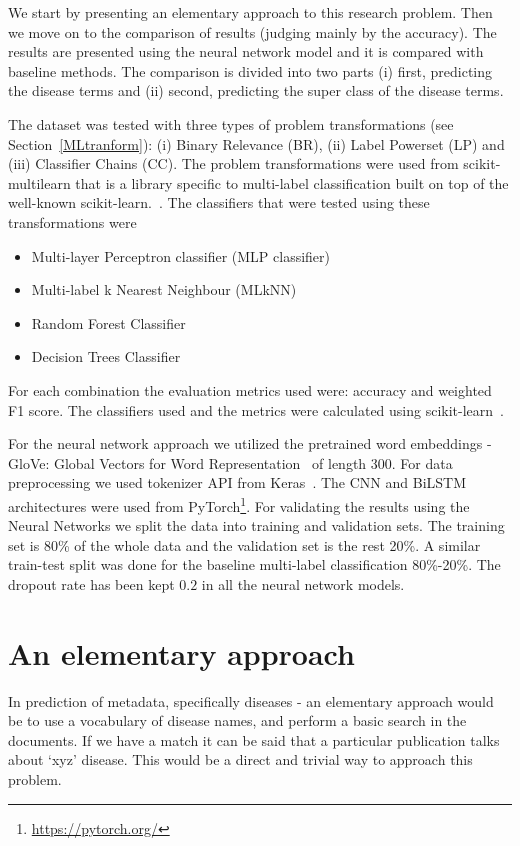 We start by presenting an elementary approach to this research problem. Then we move on to the comparison of results (judging mainly by the accuracy). The results are presented using the neural network model and it is compared with baseline methods. The comparison is divided into two parts (i) first, predicting the disease terms and (ii) second, predicting the super class of the disease terms.

The dataset was tested with three types of problem transformations (see Section~\ref{MLtranform}): (i) Binary Relevance (BR), (ii) Label Powerset (LP) and (iii) Classifier Chains (CC). The problem transformations were used from scikit-multilearn that is a library specific to multi-label classification built on top of the well-known scikit-learn.~\cite{2017arXiv171100046S}. The classifiers that were tested using these transformations were 
\begin{itemize}
    \item Multi-layer Perceptron classifier (MLP classifier) 
    \item Multi-label k Nearest Neighbour (MLkNN) 
    \item Random Forest Classifier 
    \item Decision Trees Classifier 
\end{itemize}
For each combination the evaluation metrics used were: accuracy and weighted F1 score. The classifiers used and the metrics were calculated using scikit-learn~\cite{scikit-learn}. 

For the neural network approach we utilized the pretrained word embeddings - GloVe: Global Vectors for Word Representation~\cite{pennington2014glove} of length 300. For data preprocessing we used tokenizer API from Keras~\cite{chollet2015keras}. The CNN and BiLSTM architectures were used from PyTorch\footnote{\url{https://pytorch.org/}}.
For validating the results using the Neural Networks we split the data into training and validation sets. The training set is 80\% of the whole data and the validation set is the rest 20\%. A similar train-test split was done for the baseline multi-label classification 80\%-20\%. The dropout rate has been kept $0.2$ in all the neural network models. 

\section{An elementary approach}
In prediction of metadata, specifically diseases - an elementary approach would be to use a vocabulary of disease names, and perform a basic search in the documents. If we have a match it can be said that a particular publication talks about `xyz' disease. This would be a direct and trivial way to approach this problem. 

